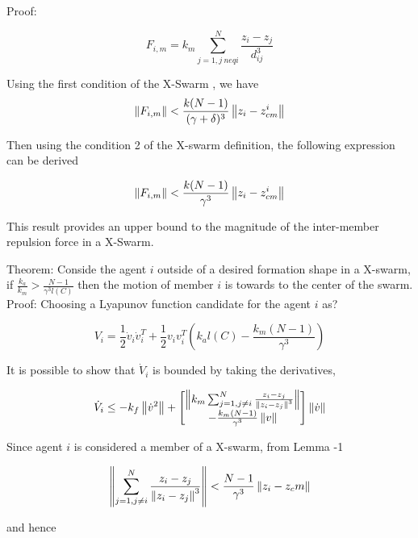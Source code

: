 Proof:

\begin{equation}
F_{i,m} = k_m \sum_{j=1, j\ neq i}^{N} \frac{z_i - z_j}{d_{ij}^3} 
\end{equation}

Using the first condition of the X-Swarm , we have
\begin{equation}
\left\lVert F_{i,m}\right\rVert < \frac{k(N-1)}{(\gamma + \delta)^3} \left\lVert z_i - z_{cm}^i\right\rVert
\end{equation}

Then using the condition 2 of the X-swarm definition, the following expression can be derived

\begin{equation}
\left\lVert F_{i,m}\right\rVert < \frac{k(N-1)}{\gamma^3} \left\lVert z_i - z_{cm}^i\right\rVert
\end{equation}

This result provides an upper bound to the magnitude of the inter-member repulsion force in a X-Swarm.  
		
Theorem: Conside the agent $i$	outside of a desired formation shape in a X-swarm, if $\frac{k_a}{k_m} > \frac{N-1}{\gamma^3  l(C)}$ then the motion of member $i$ is towards to the center of the swarm. 
Proof: Choosing a Lyapunov function candidate for the agent $i$ as?

\begin{equation}
V_i = \frac{1}{2} \dot{v}_i \dot{v}_i^T + \frac{1}{2} v_i v_i^T\left(k_al(C)-\frac{k_m(N-1)}{\gamma^3}\right) 
\end{equation}

It is possible to show that $\dot{V}_i$ is bounded by taking the derivatives,
			
\begin{equation}
\dot{V}_i \leq -k_f \left\lVert\dot{v}^2\right\rVert + \begin{bmatrix}
\left\lVert k_m \sum_{j=1, j \neq i}^{N} \frac{z_i - z_j}{\left\lVert z_i - z_j\right\rVert^3}\right\rVert \\
- \frac{k_m(N-1)}{\gamma ^3} \left\lVert v\right\rVert
\end{bmatrix} \left\lVert\dot{v}\right\rVert
\end{equation}
			
Since agent $i$ is considered a member of a X-swarm, from Lemma -1

\begin{equation}
\left\lVert \sum_{j=1, j \neq i}^{N} \frac{z_i - z_j}{\left\lVert z_i - z_j\right\rVert^3}\right\rVert < \frac{N-1}{\gamma^3} \left\lVert z_i - z_cm\right\rVert
\end{equation}

and hence

